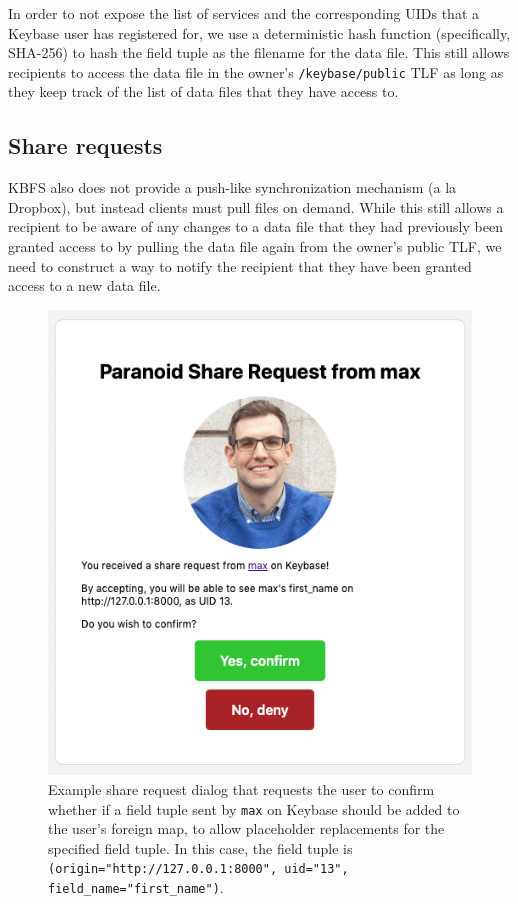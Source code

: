 \documentclass[letterpaper,twocolumn,10pt]{article}
\begin{document}
In order to not expose the list of services and the corresponding UIDs that a Keybase user has registered for, we use a deterministic hash function (specifically, SHA-256) to hash the field tuple as the filename for the data file. This still allows recipients to access the data file in the owner's \texttt{/keybase/public} TLF as long as they keep track of the list of data files that they have access to.

\subsection{Share requests}

KBFS also does not provide a push-like synchronization mechanism (a la Dropbox), but instead clients must pull files on demand. While this still allows a recipient to be aware of any changes to a data file that they had previously been granted access to by pulling the data file again from the owner's public TLF, we need to construct a way to notify the recipient that they have been granted access to a new data file.

\begin{figure}[]
    \centering
    \includegraphics[width=0.8\columnwidth]{png/share_request.png}
    \caption{Example share request dialog that requests the user to confirm whether if a field tuple sent by \texttt{max} on Keybase should be added to the user's foreign map, to allow placeholder replacements for the specified field tuple. In this case, the field tuple is \texttt{(origin="http://127.0.0.1:8000", uid="13", field\_name="first\_name")}.}
    \label{fig:share_request}
\end{figure}
\end{document}
